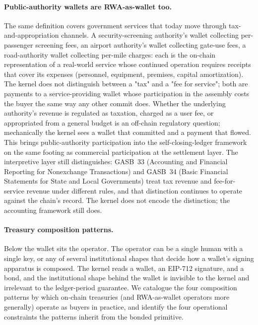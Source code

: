 \documentclass[11pt,a4paper]{article}
\theoremstyle{definition}
\theoremstyle{remark}
\begin{document}
\paragraph{Public-authority wallets are RWA-as-wallet too.}
The same definition covers government services that today move
through tax-and-appropriation channels. A security-screening
authority's wallet collecting per-passenger screening fees, an
airport authority's wallet collecting gate-use fees, a
road-authority wallet collecting per-mile charges: each is the
on-chain representation of a real-world service whose continued
operation requires receipts that cover its expenses (personnel,
equipment, premises, capital amortization). The kernel does not
distinguish between a "tax" and a "fee for service"; both are
payments to a service-providing wallet whose participation in
the assembly costs the buyer the same way any other commit
does. Whether the underlying authority's revenue is regulated
as taxation, charged as a user fee, or appropriated from a
general budget is an off-chain regulatory question; mechanically
the kernel sees a wallet that committed and a payment that
flowed. This brings public-authority participation into the
self-closing-ledger framework on the same footing as commercial
participation at the settlement layer. The interpretive layer
still distinguishes: GASB~33 (Accounting and Financial Reporting
for Nonexchange Transactions) and GASB~34 (Basic Financial
Statements for State and Local Governments)
\citep{gasb1998n33, gasb1999n34} treat tax revenue and
fee-for-service revenue under different rules, and that
distinction continues to operate against the chain's record.
The kernel does not encode the distinction; the accounting
framework still does.

\paragraph{Treasury composition patterns.}
Below the wallet sits the operator. The operator can be a single
human with a single key, or any of several institutional shapes
that decide how a wallet's signing apparatus is composed. The
kernel reads a wallet, an EIP-712 signature, and a bond, and the
institutional shape behind the wallet is invisible to the kernel
and irrelevant to the ledger-period guarantee. We catalogue the
four composition patterns by which on-chain treasuries (and
RWA-as-wallet operators more generally) operate as buyers in
practice, and identify the four operational constraints the
patterns inherit from the bonded primitive.
\end{document}

